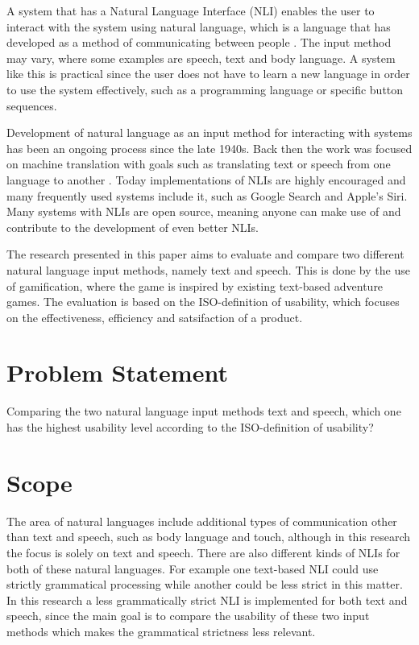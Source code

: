 A system that has a Natural Language Interface (NLI) enables the user to interact with the system using natural language, which is a language that has developed as a method of communicating between people \citep{NatLan}. The input method may vary, where some examples are speech, text and body language. A system like this is practical since the user does not have to learn a new language in order to use the system effectively, such as a programming language or specific button sequences.

Development of natural language as an input method for interacting with systems has been an ongoing process since the late 1940s. Back then the work was focused on machine translation with goals such as translating text or speech from one language to another \citep{Jones}. Today implementations of NLIs are highly encouraged and many frequently used systems include it, such as Google Search and Apple's Siri. Many systems with NLIs are open source, meaning anyone can make use of and contribute to the development of even better NLIs.

The research presented in this paper aims to evaluate and compare two different natural language input methods, namely text and speech. This is done by the use of gamification, where the game is inspired by existing text-based adventure games. The evaluation is based on the ISO-definition of usability, which focuses on the effectiveness, efficiency and satsifaction of a product. \citep{ISO}

\section{Problem Statement}
Comparing the two natural language input methods text and speech, which one has the highest usability level according to the ISO-definition of usability?

\section{Scope}
The area of natural languages include additional types of communication other than text and speech, such as body language and touch, although in this research the focus is solely on text and speech. There are also different kinds of NLIs for both of these natural languages. For example one text-based NLI could use strictly grammatical processing while another could be less strict in this matter. In this research a less grammatically strict NLI is implemented for both text and speech, since the main goal is to compare the usability of these two input methods which makes the grammatical strictness less relevant.


